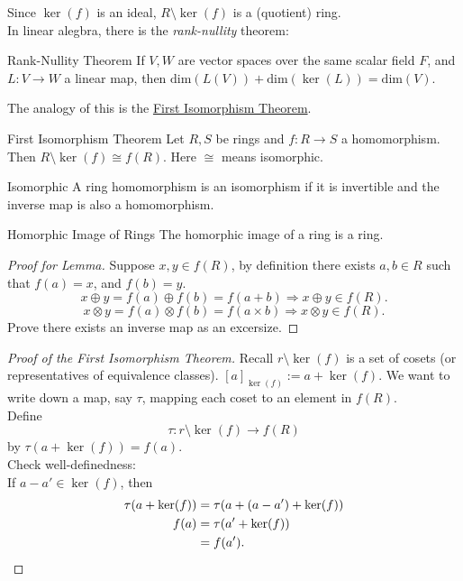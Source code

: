 \documentclass[twoside, openright, fontsize=10pt, headings=big]{scrbook}
\begin{document}
Since $\ker(f)$ is an ideal, $R\setminus\ker(f)$ is a (quotient) ring.\\
In linear alegbra, there is the \textit{rank-nullity} theorem:
\begin{theorem}{Rank-Nullity Theorem}{}
    If $V,W$ are vector spaces over the same scalar field $F$, and $L:V\to W$ a linear map, then $\mathrm{dim}(L(V))+\mathrm{dim}(\ker(L))=\mathrm{dim}(V).$
\end{theorem}
The analogy of this is the \underline{First Isomorphism Theorem}.
\begin{theorem}{First Isomorphism Theorem}{}
    Let $R,S$ be rings and $f:R\to S$ a homomorphism. Then $R\setminus\ker(f)\cong f(R)$. Here $\cong$ means isomorphic.
\end{theorem}
\begin{definition}{Isomorphic}{}{}
    A ring homomorphism is an isomorphism if it is invertible and the inverse map is also a homomorphism.
\end{definition}
\begin{lemma}{Homorphic Image of Rings}{}
    The homorphic image of a ring is a ring.
\end{lemma}
\begin{proof}[Proof for Lemma]
    Suppose $x,y\in f(R)$, by definition there exists $a,b\in R$ such that $f(a)=x$, and $f(b)=y$.
    \[
        x\oplus y=f(a)\oplus f(b)=f(a+b)\Rightarrow x\oplus y\in f(R).
    \]
    \[
        x\otimes y=f(a)\otimes f(b)=f(a\times b)\Rightarrow x\otimes y\in f(R).
    \]
    Prove there exists an inverse map as an excersize. \qedhere
\end{proof}
\begin{proof}[Proof of the First Isomorphism Theorem]
   Recall $r\setminus\ker(f)$ is a set of cosets (or representatives of equivalence classes). $[a]_{\ker(f)}:=a+\ker(f).$ We want to write down a map, say $\tau$, mapping each coset to an element in $f(R)$.\\
   Define 
   \[
        \tau:r\setminus\ker(f)\to f(R)
   \]
   by $\tau(a+\ker(f))=f(a)$.\\
   Check well-definedness:\\
   If $a-a'\in\ker(f)$, then 
   \begin{align*}
        \tau(a+\ker(f))&=\tau(a+(a-a')+\ker(f))\\
        f(a)&=\tau(a'+\ker(f))\\
        &=f(a').\qedhere
   \end{align*}
\end{proof}
\end{document}
